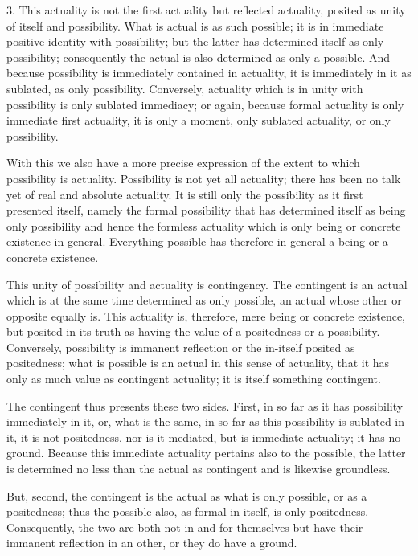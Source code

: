 3. This actuality is not the first actuality but reflected actuality,
posited as unity of itself and possibility.
What is actual is as such possible;
it is in immediate positive identity with possibility;
but the latter has determined itself as only possibility;
consequently the actual is also determined as only a possible.
And because possibility is immediately contained in actuality,
it is immediately in it as sublated, as only possibility.
Conversely, actuality which is in unity with possibility
is only sublated immediacy;
or again, because formal actuality is only immediate first actuality,
it is only a moment, only sublated actuality, or only possibility.

With this we also have a more precise expression of
the extent to which possibility is actuality.
Possibility is not yet all actuality;
there has been no talk yet of real and absolute actuality.
It is still only the possibility as it first presented itself,
namely the formal possibility that has determined itself
as being only possibility and hence the formless actuality
which is only being or concrete existence in general.
Everything possible has therefore in general
a being or a concrete existence.

This unity of possibility and actuality is contingency.
The contingent is an actual which is at the same time
determined as only possible, an actual whose other or opposite equally is.
This actuality is, therefore, mere being or concrete existence,
but posited in its truth as having the value
of a positedness or a possibility.
Conversely, possibility is immanent reflection
or the in-itself posited as positedness;
what is possible is an actual in this sense of actuality,
that it has only as much value as contingent actuality;
it is itself something contingent.

The contingent thus presents these two sides.
First, in so far as it has possibility immediately in it,
or, what is the same, in so far as
this possibility is sublated in it,
it is not positedness, nor is it mediated,
but is immediate actuality; it has no ground.
Because this immediate actuality pertains also to the possible,
the latter is determined no less than the actual as contingent
and is likewise groundless.

But, second, the contingent is the actual
as what is only possible, or as a positedness;
thus the possible also, as formal in-itself, is only positedness.
Consequently, the two are both not in and for themselves
but have their immanent reflection in an other,
or they do have a ground.

